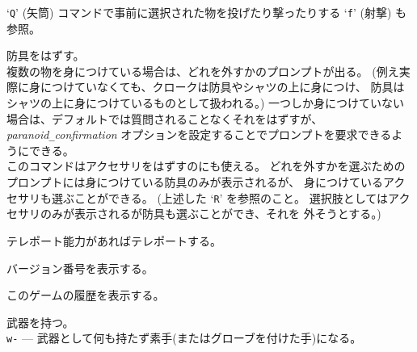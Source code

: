 `{\tt Q}' (矢筒) コマンドで事前に選択された物を投げたり撃ったりする
`{\tt f}' (射撃) も参照。
\item[\tb{T}]
防具をはずす。\\
複数の物を身につけている場合は、どれを外すかのプロンプトが出る。
(例え実際に身につけていなくても、クロークは防具やシャツの上に身につけ、
防具はシャツの上に身につけているものとして扱われる。)
一つしか身につけていない場合は、デフォルトでは質問されることなくそれをはずすが、
{\it paranoid\verb+_+confirmation\/}
オプションを設定することでプロンプトを要求できるようにできる。\\
このコマンドはアクセサリをはずすのにも使える。
どれを外すかを選ぶためのプロンプトには身につけている防具のみが表示されるが、
身につけているアクセサリも選ぶことができる。
(上述した `{\tt R}' を参照のこと。
選択肢としてはアクセサリのみが表示されるが防具も選ぶことができ、それを
外そうとする。)
\item[\tb{\^{}T}]
テレポート能力があればテレポートする。
\item[\tb{v}]
バージョン番号を表示する。
\item[\tb{V}]
このゲームの履歴を表示する。
\item[\tb{w}]
武器を持つ。\\
{\tt w-} --- 武器として何も持たず素手(またはグローブを付けた手)になる。\\
